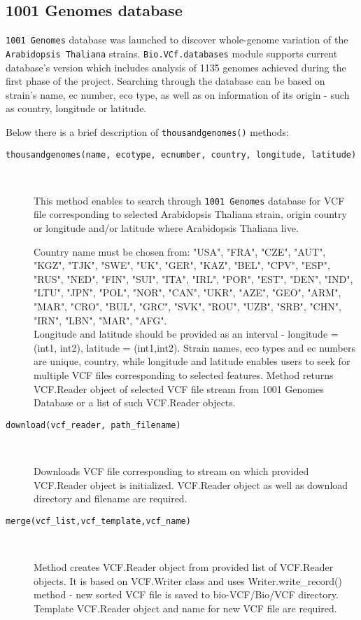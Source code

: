 \subsection{1001 Genomes database}
\label{sec:object}


\verb|1001 Genomes| database was launched to discover whole-genome variation of the \verb|Arabidopsis Thaliana| strains.
\verb|Bio.VCf.databases| module supports current database's version which includes analysis of 1135 genomes achieved
during the first phase of the project.
Searching through the database can be based on strain's name, ec number, eco type, as well as on information of its
origin - such as country, longitude or latitude.


\noindent Below there is a brief description of \verb|thousandgenomes()| methods:


\begin{description}
  \item[\texttt{thousandgenomes(name, ecotype, ecnumber, country, longitude, latitude)}] \

    This method enables to search through \verb|1001 Genomes| database for VCF file corresponding to selected
    Arabidopsis Thaliana strain, origin country or longitude and/or latitude where Arabidopsis Thaliana live.

    Country name must be chosen from: "USA", "FRA", "CZE", "AUT", "KGZ", "TJK", "SWE", "UK", "GER", "KAZ",
    "BEL", "CPV", "ESP", "RUS", "NED", "FIN", "SUI", "ITA", "IRL", "POR", "EST", "DEN", "IND", "LTU", "JPN", "POL", "NOR",
    "CAN", "UKR", "AZE", "GEO", "ARM", "MAR", "CRO", "BUL", "GRC", "SVK", "ROU", "UZB", "SRB", "CHN", "IRN", "LBN", "MAR",
    "AFG".\\
\vspace{5mm}
    Longitude and latitude should be provided as an interval - longitude = (int1, int2), latitude = (int1,int2).
    Strain names, eco types and ec numbers are unique, country, while longitude and latitude enables users to seek for
    multiple VCF files corresponding to selected features.
    Method returns VCF.Reader object of selected VCF file stream from 1001 Genomes Database or a list of
    such VCF.Reader objects.

\item[\texttt{download(vcf\_reader, path\_filename)}] \

    Downloads VCF file corresponding to stream on which provided VCF.Reader object is initialized.
    VCF.Reader object as well as download directory and filename are required.

\item[\texttt{merge(vcf\_list,vcf\_template,vcf\_name)}] \

    Method creates VCF.Reader object from provided list of VCF.Reader objects.
    It is based on VCF.Writer class and uses Writer.write\_record() method - new sorted VCF file is saved to
    bio-VCF/Bio/VCF directory.
    Template VCF.Reader object and name for new VCF file are required.

\end{description}

